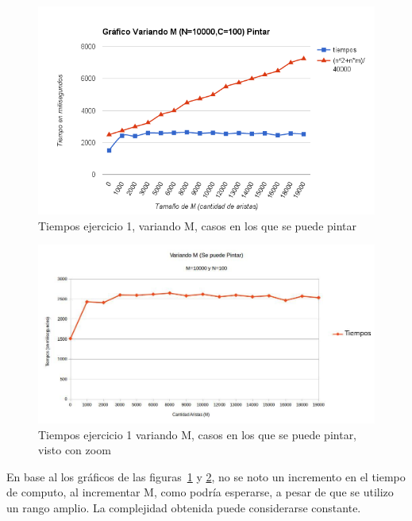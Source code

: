 \begin{figure}[H]
 \begin{center}
     \includegraphics[scale=0.6]{../Ejercicio1VariandoMPintar.png}
 \end{center}
 \label{m}
 \caption{Tiempos ejercicio 1, variando M, casos en los que se puede pintar}
\end{figure}


\begin{figure}[H]
 \begin{center}
     \includegraphics[scale=0.45]{../N10000C100VariandoMSePuedePintar.jpg}
 \end{center}
 \label{mz}
 \caption{Tiempos ejercicio 1 variando M, casos en los que se puede pintar, visto con zoom}
\end{figure}

En base al los gráficos de las figuras~\ref{m} y \ref{mz}, no se noto un incremento en el tiempo de computo, al incrementar M, como podría esperarse, a pesar de que se utilizo un rango amplio. La complejidad obtenida puede considerarse constante.

